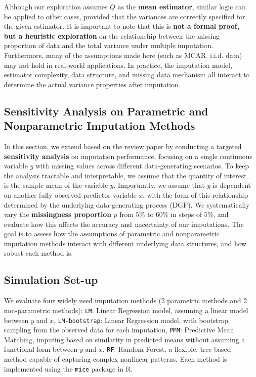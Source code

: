 \documentclass[12pt,oneside]{amsart}
\theoremstyle{definition}
\theoremstyle{remark}
\numberwithin{equation}{section}
\begin{document}
Although our exploration assumes $Q$ as the \textbf{mean estimator}, similar logic can be applied to other cases, provided that the variances are correctly specified for the given estimator. It is important to note that this is \textbf{not a formal proof, but a heuristic exploration} on the relationship between the missing proportion of data and the total variance under multiple imputation. Furthermore, many of the assumptions made here (such as MCAR, i.i.d. data) may not hold in real-world applications. In practice, the imputation model, estimator complexity, data structure, and missing data mechanism all interact to determine the actual variance properties after imputation.



\subsection{Sensitivity Analysis on Parametric and Nonparametric Imputation Methods}
In this section, we extend based on the review paper by conducting a targeted \textbf{sensitivity analysis} on imputation performance, focusing on a single continuous variable $y$ with missing values across different data-generating scenarios. To keep the analysis tractable and interpretable, we assume that the quantity of interest is the sample mean of the variable $y$. Importantly, we assume that $y$ is dependent on another fully observed predictor variable $x$, with the form of this relationship determined by the underlying data-generating process (DGP). We systematically vary the \textbf{missingness proportion} $p$ from $5\%$ to $60\%$ in steps of $5\%$, and evaluate how this affects the accuracy and uncertainty of our imputations. The goal is to assess how the assumptions of parametric and nonparametric imputation methods interact with different underlying data structures, and how robust each method is.

\subsection{Simulation Set-up}
We evaluate four widely used imputation methods ($2$ parametric methods and $2$ non-parametric methods): \texttt{LM}: Linear Regression model, assuming a linear model between $y$ and $x$, \texttt{LM-bootstrap}: Linear Regression model, with bootstrap sampling from the observed data for each imputation, \texttt{PMM}: Predictive Mean Matching, imputing based on similarity in predicted means without assuming a functional form between $y$ and $x$, \texttt{RF}: Random Forest, a flexible, tree-based method capable of capturing complex nonlinear patterns. Each method is implemented using the \texttt{mice} package in R.
\end{document}
